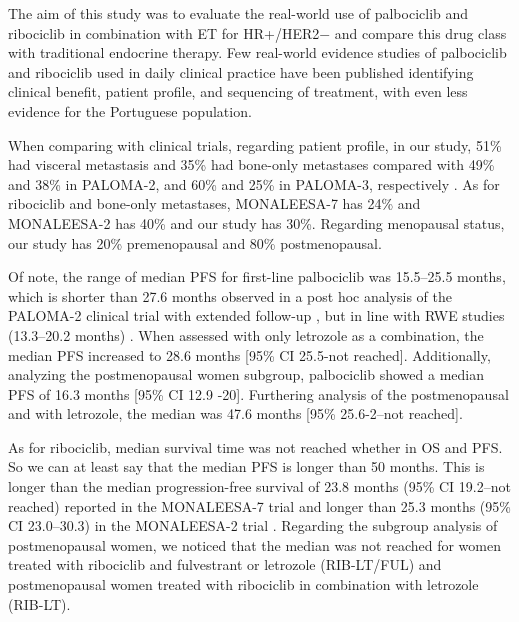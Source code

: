 The aim of this study was to evaluate the real-world use of palbociclib and ribociclib in combination with ET for HR+/HER2$-$ and compare this drug class with traditional endocrine therapy. Few real-world evidence studies of palbociclib and ribociclib used in daily clinical practice have been published identifying clinical benefit, patient profile, and sequencing of treatment, with even less evidence for the Portuguese population.

When comparing with clinical trials, regarding patient profile, in our study, 51\% had visceral metastasis and 35\% had bone-only metastases compared with 49\% and 38\% in PALOMA-2, and 60\% and 25\% in PALOMA-3, respectively \cite{rugoImpactPalbociclibLetrozole2018,cristofanilliFulvestrantPalbociclibFulvestrant2016a}.
As for ribociclib and bone-only metastases, MONALEESA-7 \cite{tripathyRibociclibEndocrineTherapy2018} has 24\% and MONALEESA-2 has 40\% \cite{hortobagyiUpdatedResultsMONALEESA22018} and our study has 30\%. Regarding menopausal status, our study has 20\% premenopausal and 80\% postmenopausal. 



Of note, the range of median PFS for first-line palbociclib was 15.5–25.5 months, which is shorter than 27.6 months observed in a post hoc analysis of the PALOMA-2 clinical trial with extended follow-up \cite{rugoImpactPalbociclibLetrozole2018}, but in line with RWE studies (13.3–20.2 months) \cite{harbeckCDK4InhibitorsHR2021}. When assessed with only letrozole as a combination, the median PFS increased to 28.6 months [95\% CI 25.5-not reached]. Additionally, analyzing the postmenopausal women subgroup, palbociclib showed a median PFS of 16.3 months [95\% CI 12.9 -20]. Furthering analysis of the postmenopausal and with letrozole, the median was 47.6 months [95\% 25.6-2–not reached].

As for ribociclib, median survival time was not reached whether in OS and PFS. So we can at least say that the median PFS is longer than 50 months. This is longer than the median progression-free survival of 23.8 months (95\% CI 19.2–not reached) reported in the MONALEESA-7 trial \cite{tripathyRibociclibEndocrineTherapy2018} and longer than  25.3 months (95\% CI 23.0–30.3) in the MONALEESA-2 trial \cite{hortobagyiUpdatedResultsMONALEESA22018}. Regarding the subgroup analysis of postmenopausal women, we noticed that the median was not reached for women treated with ribociclib and fulvestrant or letrozole (RIB-LT/FUL) and postmenopausal women treated with ribociclib in combination with letrozole (RIB-LT).

